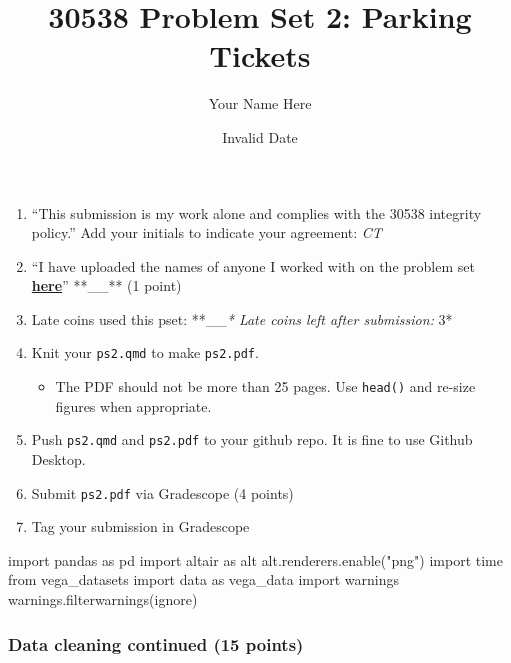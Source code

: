 \documentclass[
  letterpaper,
  DIV=11,
  numbers=noendperiod]{scrartcl}
\title{30538 Problem Set 2: Parking Tickets}
\author{Your Name Here}
\date{Invalid Date}
\newenvironment{Shaded}{\begin{snugshade}}{\end{snugshade}}
\newcommand{\ImportTok}[1]{\textcolor[rgb]{0.00,0.46,0.62}{#1}}
\newcommand{\NormalTok}[1]{\textcolor[rgb]{0.00,0.23,0.31}{#1}}
\newcommand{\StringTok}[1]{\textcolor[rgb]{0.13,0.47,0.30}{#1}}
\providecommand{\tightlist}{%
  \setlength{\itemsep}{0pt}\setlength{\parskip}{0pt}}\usepackage{longtable,booktabs,array}
\begin{document}
\maketitle


\begin{enumerate}
\def\labelenumi{\arabic{enumi}.}
\tightlist
\item
  ``This submission is my work alone and complies with the 30538
  integrity policy.'' Add your initials to indicate your agreement:
  \emph{CT}
\item
  ``I have uploaded the names of anyone I worked with on the problem set
  \textbf{\href{https://docs.google.com/forms/d/1-zzHx762odGlpVWtgdIC55vqF-j3gqdAp6Pno1rIGK0/edit}{here}}''
  **\_\_** (1 point)
\item
  Late coins used this pset: **\_\_\emph{* Late coins left after
  submission: }3*
\item
  Knit your \texttt{ps2.qmd} to make \texttt{ps2.pdf}.

  \begin{itemize}
  \tightlist
  \item
    The PDF should not be more than 25 pages. Use \texttt{head()} and
    re-size figures when appropriate.
  \end{itemize}
\item
  Push \texttt{ps2.qmd} and \texttt{ps2.pdf} to your github repo. It is
  fine to use Github Desktop.
\item
  Submit \texttt{ps2.pdf} via Gradescope (4 points)
\item
  Tag your submission in Gradescope
\end{enumerate}

\begin{Shaded}
\begin{Highlighting}[]
\ImportTok{import}\NormalTok{ pandas }\ImportTok{as}\NormalTok{ pd}
\ImportTok{import}\NormalTok{ altair }\ImportTok{as}\NormalTok{ alt}
\NormalTok{alt.renderers.enable(}\StringTok{"png"}\NormalTok{)}
\ImportTok{import}\NormalTok{ time}
\ImportTok{from}\NormalTok{ vega\_datasets }\ImportTok{import}\NormalTok{ data }\ImportTok{as}\NormalTok{ vega\_data}
\ImportTok{import}\NormalTok{ warnings }
\NormalTok{warnings.filterwarnings(}\StringTok{\textquotesingle{}ignore\textquotesingle{}}\NormalTok{)}
\end{Highlighting}
\end{Shaded}

\subsubsection{Data cleaning continued (15
points)}\label{data-cleaning-continued-15-points}
\end{document}
